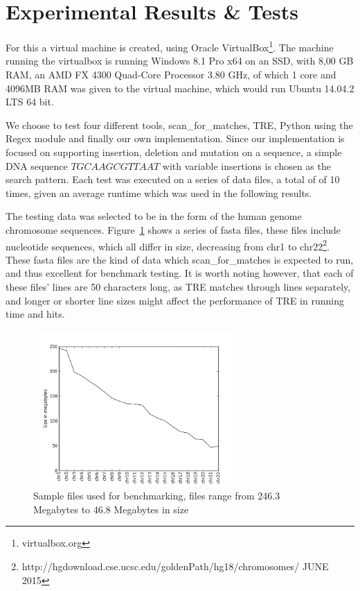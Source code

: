 \section{Experimental Results \& Tests}
For this a virtual machine is created, using Oracle VirtualBox\footnote{virtualbox.org}. The machine running the virtualbox is running Windows 8.1 Pro x64 on an SSD, with 8,00 GB RAM, an AMD FX 4300 Quad-Core Processor 3.80 GHz, of which 1 core and 4096MB RAM was given to the virtual machine, which would run Ubuntu 14.04.2 LTS 64 bit.

We choose to test four different tools, scan\_for\_matches, TRE, Python using the Regex module and finally our own implementation. Since our implementation is focused on supporting insertion, deletion and mutation on a sequence, a simple DNA sequence $TGCAAGCGTTAAT$ with variable insertions is chosen as the search pattern. Each test was executed on a series of data files, a total of of 10 times, given an average runtime which was used in the following results.


The testing data was selected to be in the form of the human genome chromosome sequences. Figure~\ref{fig:size} shows a series of fasta files, these files include nucleotide sequences, which all differ in size, decreasing from chr1 to chr22\footnote{http://hgdownload.cse.ucsc.edu/goldenPath/hg18/chromosomes/ JUNE 2015}. These fasta files are the kind of data which scan\_for\_matches is expected to run, and thus excellent for benchmark testing. It is worth noting however, that each of these files' lines are 50 characters long, as TRE matches through lines separately, and longer or shorter line sizes might affect the performance of TRE in running time and hits.%
\begin{figure}[h!]
\centering
\includegraphics[width=0.7\textwidth]{Benchmarking/size.png}
\caption{Sample files used for benchmarking, files range from 246.3 Megabytes to 46.8 Megabytes in size}
\label{fig:size}
\end{figure}

